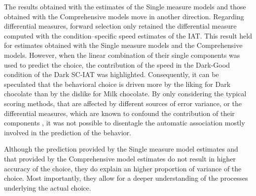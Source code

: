 \documentclass[12pt]{book}
\begin{document}
The results obtained with the estimates of the Single measure models and those obtained with the Comprehensive models move in another direction. 
Regarding differential measures, forward selection only retained the differential measure computed with the condition--specific speed estimates of the IAT. 
This result held for estimates obtained with the Single measure models and the Comprehensive models. 
However, when the linear combination of their single components was used to predict the choice, the contribution of the speed in the Dark-Good condition of the Dark SC-IAT was highlighted.
Consequently, it can be speculated that the behavioral choice is driven more by the liking for Dark chocolate than by the dislike for Milk chocolate. 
By only considering the typical scoring methods, that are affected by different sources of error variance, or the differential measures, which are known to confound the contribution of their components \cite{fiedler2006}, it was not possible to disentagle the automatic association mostly involved in the prediction of the behavior.

 Although the prediction 
 provided by the Single measure model estimates and that provided by the Comprehensive model estimates do not result in higher accuracy of the choice, they do explain an higher proportion of variance of the choice. 
 Most importantly, they allow for a deeper understanding of the processes underlying the actual choice. 
 
\end{document}
